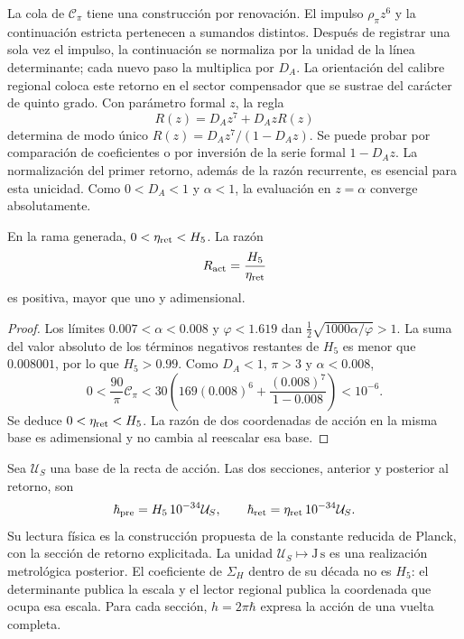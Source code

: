 La cola de \(\mathcal C_\pi\) tiene una construcción por renovación.
El impulso \(\rho_\pi z^6\) y la continuación estricta pertenecen
a sumandos distintos. Después de registrar una sola vez el impulso,
la continuación se normaliza por la unidad de la línea determinante;
cada nuevo paso la multiplica por \(D_A\). La orientación del
calibre regional coloca este retorno en el sector compensador que
se sustrae del carácter de quinto grado.
Con parámetro formal \(z\), la regla
\begin{equation}
 R(z)=D_Az^7+D_AzR(z)
 \label{vi:vi:dep:renovacion}
\end{equation}
determina de modo único
\(R(z)=D_Az^7/(1-D_Az)\). Se puede probar por comparación de
coeficientes o por inversión de la serie formal \(1-D_Az\).
La normalización del primer retorno, además de la razón recurrente,
es esencial para esta unicidad. Como \(0<D_A<1\) y \(\alpha<1\),
la evaluación en \(z=\alpha\) converge absolutamente.

\begin{proposition}
\label{vi:vi:dep:positividad-accion}
En la rama generada, \(0<\eta_{\rm ret}<H_5\). La razón
\begin{equation}
 R_{\rm act}=\frac{H_5}{\eta_{\rm ret}}
 \label{vi:vi:dep:Ract}
\end{equation}
es positiva, mayor que uno y adimensional.
\end{proposition}
\begin{proof}
Los límites \(0.007<\alpha<0.008\) y \(\varphi<1.619\) dan
\(\tfrac12\sqrt{1000\alpha/\varphi}>1\). La suma del valor absoluto
de los términos negativos restantes de \(H_5\) es menor que
\(0.008001\), por lo que \(H_5>0.99\).
Como \(D_A<1\), \(\pi>3\) y \(\alpha<0.008\),
\[
 0<\frac{90}{\pi}\mathcal C_\pi
 <30\left(169(0.008)^6+
                  \frac{(0.008)^7}{1-0.008}\right)<10^{-6}.
\]
Se deduce \(0<\eta_{\rm ret}<H_5\). La razón de dos coordenadas
de acción en la misma base es adimensional y no cambia al reescalar
esa base.
\end{proof}

Sea \(\mathcal U_S\) una base de la recta de acción. Las dos
secciones, anterior y posterior al retorno, son
\begin{equation}
 \hbar_{\rm pre}=H_5\,10^{-34}\mathcal U_S,
 \qquad
 \hbar_{\rm ret}=\eta_{\rm ret}\,10^{-34}\mathcal U_S.
 \label{vi:vi:dep:hbar}
\end{equation}
Su lectura física es la construcción propuesta de la constante reducida
de Planck, con la sección de retorno explicitada. La unidad
\(\mathcal U_S\mapsto\mathrm{J\,s}\) es una realización metrológica
posterior. El coeficiente de \(\Sigma_H\) dentro de su década no es
\(H_5\): el determinante publica la escala y el lector regional
publica la coordenada que ocupa esa escala. Para cada sección,
\(h=2\pi\hbar\) expresa la acción de una vuelta completa.

